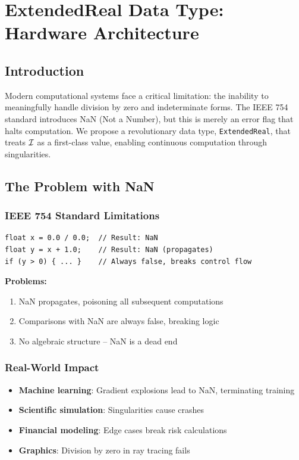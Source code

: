 \chapter{ExtendedReal Data Type: Hardware Architecture}
\label{ch:extended-real-type}

\section{Introduction}

Modern computational systems face a critical limitation: the inability to meaningfully handle division by zero and indeterminate forms. The IEEE 754 standard introduces NaN (Not a Number), but this is merely an error flag that halts computation. We propose a revolutionary data type, \texttt{ExtendedReal}, that treats $\mathcal{I}$ as a first-class value, enabling continuous computation through singularities.

\section{The Problem with NaN}

\subsection{IEEE 754 Standard Limitations}

\begin{verbatim}
float x = 0.0 / 0.0;  // Result: NaN
float y = x + 1.0;    // Result: NaN (propagates)
if (y > 0) { ... }    // Always false, breaks control flow
\end{verbatim}

\textbf{Problems:}
\begin{enumerate}
    \item NaN propagates, poisoning all subsequent computations
    \item Comparisons with NaN are always false, breaking logic
    \item No algebraic structure -- NaN is a dead end
\end{enumerate}

\subsection{Real-World Impact}

\begin{itemize}
    \item \textbf{Machine learning}: Gradient explosions lead to NaN, terminating training
    \item \textbf{Scientific simulation}: Singularities cause crashes
    \item \textbf{Financial modeling}: Edge cases break risk calculations
    \item \textbf{Graphics}: Division by zero in ray tracing fails
\end{itemize}

